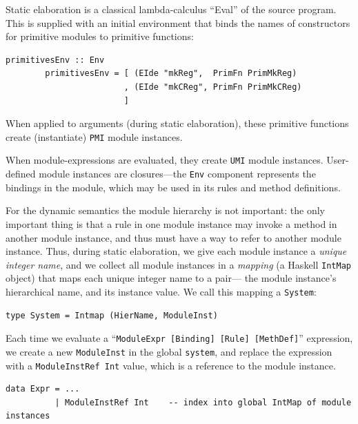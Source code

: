 \documentclass[11pt]{article}
\newcommand{\term}[1]{\texttt{#1}}
\begin{document}
Static elaboration is a classical lambda-calculus ``Eval'' of the
source program.  This is supplied with an initial environment that
binds the names of constructors for primitive modules to primitive
functions:

\begin{Verbatim}[frame=single, commandchars=\\\{\}]
        primitivesEnv :: Env
        primitivesEnv = [ (EIde "mkReg",  PrimFn PrimMkReg)
                        , (EIde "mkCReg", PrimFn PrimMkCReg)
                        ] 
\end{Verbatim}

When applied to arguments (during static elaboration), these primitive
functions create (instantiate) \term{PMI} module instances.

When module-expressions are evaluated, they create \term{UMI} module
instances.  User-defined module instances are closures---the
\term{Env} component represents the bindings in the module, which may
be used in its rules and method definitions.


For the dynamic semantics the module hierarchy is not important: the
only important thing is that a rule in one module instance may invoke
a method in another module instance, and thus must have a way to refer
to another module instance.  Thus, during static elaboration, we give
each module instance a \emph{unique integer name}, and we collect all
module instances in a \emph{mapping} (a Haskell \term{IntMap} object)
that maps each unique integer name to a pair--- the module instance's
hierarchical name, and its instance value.  We call this mapping a
\term{System}:

\begin{Verbatim}[frame=single, commandchars=\\\{\}]
type System = Intmap (HierName, ModuleInst)
\end{Verbatim}

Each time we evaluate a ``\verb|ModuleExpr [Binding] [Rule] [MethDef]|''
expression, we create a new \term{ModuleInst} in the global
\term{system}, and replace the expression with a \verb|ModuleInstRef Int|
value, which is a reference to the module instance.

\begin{Verbatim}[frame=single, commandchars=\\\{\}]
data Expr = ...
          | ModuleInstRef Int    -- index into global IntMap of module instances
\end{Verbatim}
\end{document}
